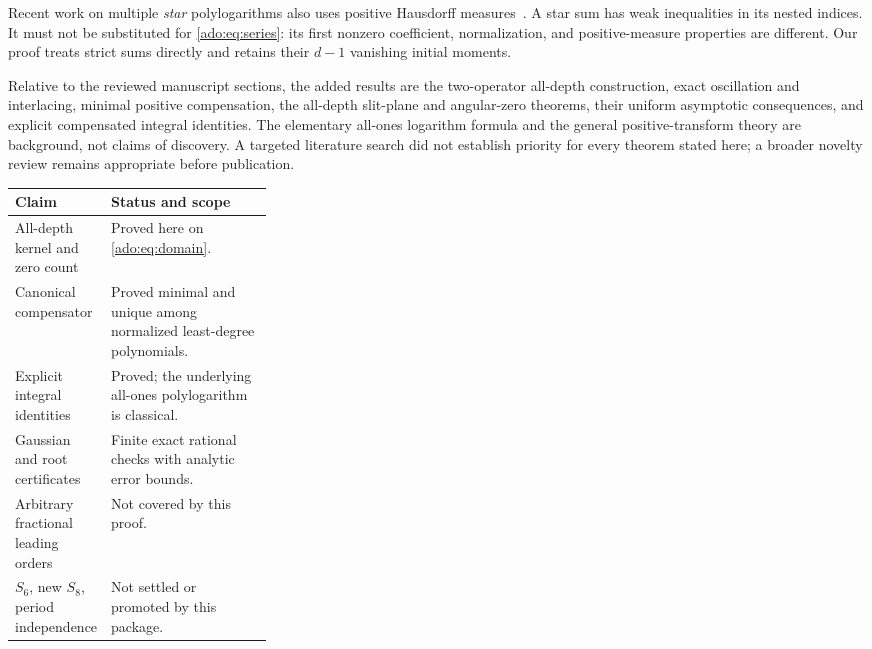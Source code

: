 Recent work on multiple \emph{star} polylogarithms also uses positive
Hausdorff measures~\cite{LiStar}. A star sum has weak inequalities in
its nested indices. It must not be substituted for
\eqref{ado:eq:series}: its first nonzero coefficient, normalization,
and positive-measure properties are different. Our proof treats strict
sums directly and retains their $d-1$ vanishing initial moments.

Relative to the reviewed manuscript sections, the added results are the
two-operator all-depth construction, exact oscillation and interlacing,
minimal positive compensation, the all-depth slit-plane and angular-zero
theorems, their uniform asymptotic consequences, and explicit
compensated integral identities. The elementary all-ones logarithm
formula and the general positive-transform theory are background, not
claims of discovery. A targeted literature search did not establish
priority for every theorem stated here; a broader novelty review remains
appropriate before publication.

\begin{center}\small
\begin{tabularx}{\linewidth}{@{}p{0.30\linewidth}X@{}}
\toprule
Claim & Status and scope\\
\midrule
All-depth kernel and zero count & Proved here on \eqref{ado:eq:domain}.\\
Canonical compensator & Proved minimal and unique among normalized least-degree polynomials.\\
Explicit integral identities & Proved; the underlying all-ones polylogarithm is classical.\\
Gaussian and root certificates & Finite exact rational checks with analytic error bounds.\\
Arbitrary fractional leading orders & Not covered by this proof.\\
$S_6$, new $S_8$, period independence & Not settled or promoted by this package.\\
\bottomrule
\end{tabularx}
\end{center}
